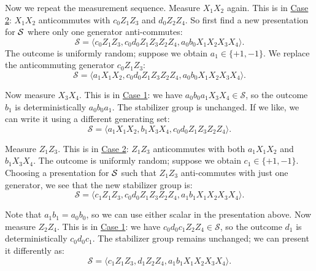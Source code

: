 \begin{example}
    Now we repeat the measurement sequence.
    Measure $X_1 X_2$ again.
    This is in \hyperref[thm:stabilizer_group_update_measurement:case2]{Case 2}: $X_1 X_2$ anticommutes with $c_0 Z_1 Z_3$ and $d_0 Z_2 Z_4$.
    So first find a new presentation for $\mathcal{S}$ where only one generator anti-commutes:
    \begin{equation}
        \mathcal{S} = \langle c_0 Z_1 Z_3, c_0 d_0 Z_1 Z_3 Z_2 Z_4, a_0 b_0 X_1 X_2 X_3 X_4 \rangle.
    \end{equation}
    The outcome is uniformly random; suppose we obtain $a_1 \in \{+1, -1\}$.
    We replace the anticommuting generator $c_0 Z_1 Z_3$:
    \begin{equation}
        \mathcal{S} = \langle a_1 X_1 X_2, c_0 d_0 Z_1 Z_3 Z_2 Z_4, a_0 b_0 X_1 X_2 X_3 X_4 \rangle.
    \end{equation}

    Now measure $X_3 X_4$.
    This is in \hyperref[thm:stabilizer_group_update_measurement:case1]{Case 1}: we have $a_0 b_0 a_1 X_3 X_4 \in \mathcal{S}$, so the outcome $b_1$ is deterministically $a_0 b_0 a_1$.
    The stabilizer group is unchanged.
    If we like, we can write it using a different generating set:
    \begin{equation}
        \mathcal{S} = \langle a_1 X_1 X_2, b_1 X_3 X_4, c_0 d_0 Z_1 Z_3 Z_2 Z_4 \rangle.
    \end{equation}

    Measure $Z_1 Z_3$.
    This is in \hyperref[thm:stabilizer_group_update_measurement:case2]{Case 2}: $Z_1 Z_3$ anticommutes with both $a_1 X_1 X_2$ and $b_1 X_3 X_4$.
    The outcome is uniformly random; suppose we obtain $c_1 \in \{+1, -1\}$.
    Choosing a presentation for $\mathcal{S}$ such that $Z_1 Z_3$ anti-commutes with just one generator, we see that the new stabilizer group is:
    \begin{equation}
        \mathcal{S} = \langle c_1 Z_1 Z_3, c_0 d_0 Z_1 Z_3 Z_2 Z_4, a_1 b_1 X_1 X_2 X_3 X_4 \rangle.
    \end{equation}

    Note that $a_1 b_1 = a_0 b_0$, so we can use either scalar in the presentation above.
    Now measure $Z_2 Z_4$.
    This is in \hyperref[thm:stabilizer_group_update_measurement:case1]{Case 1}: we have $c_0 d_0 c_1 Z_2 Z_4 \in \mathcal{S}$, so the outcome $d_1$ is deterministically $c_0 d_0 c_1$.
    The stabilizer group remains unchanged; we can present it differently as:
    \begin{equation}
        \mathcal{S} = \langle c_1 Z_1 Z_3, d_1 Z_2 Z_4, a_1 b_1 X_1 X_2 X_3 X_4 \rangle.
    \end{equation}


\end{example}
